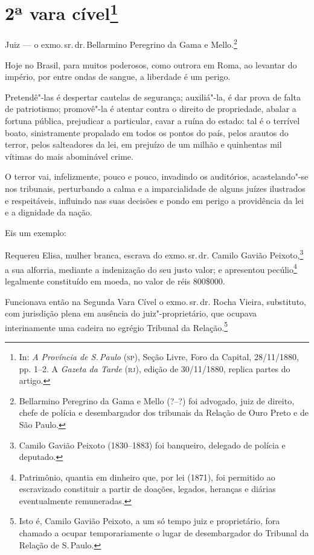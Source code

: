 \chapter{2ª vara cível\footnote[*]{In: \emph{A Província de S.\,Paulo}
  (\textsc{sp}), Seção Livre, Foro da Capital, 28/11/1880, pp. 1--2. A
  \emph{Gazeta da Tarde} (\textsc{rj}), edição de 30/11/1880, replica
  partes do artigo.}}


Juiz --- o exmo.\,sr.\,dr.\,Bellarmino Peregrino da Gama e
Mello.\footnote{Bellarmino Peregrino da Gama e Mello (?--?) foi
  advogado, juiz de direito, chefe de polícia e desembargador dos
  tribunais da Relação de Ouro Preto e de São Paulo.}\smallskip

Hoje no Brasil, para muitos poderosos, como outrora em Roma, ao levantar
do império, por entre ondas de sangue, a liberdade é um perigo.

Pretendê"-las é despertar cautelas de segurança; auxiliá"-la, é dar prova
de falta de patriotismo; promovê"-la é atentar contra o direito de
propriedade, abalar a fortuna pública, prejudicar a particular, cavar a
ruína do estado: tal é o terrível boato, sinistramente propalado em
todos os pontos do país, pelos arautos do terror, pelos salteadores da
lei, em prejuízo de um milhão e quinhentas mil vítimas do mais
abominável crime.

O terror vai, infelizmente, pouco e pouco, invadindo os auditórios,
acastelando"-se nos tribunais, perturbando a calma e a imparcialidade de
alguns juízes ilustrados e respeitáveis, influindo nas suas decisões e
pondo em perigo a providência da lei e a dignidade da nação.

Eis um exemplo:

Requereu Elisa, mulher branca, escrava do exmo.\,sr.\,dr. Camilo Gavião
Peixoto,\footnote{Camilo Gavião Peixoto (1830--1883) foi banqueiro,
  delegado de polícia e deputado.} a sua alforria, mediante a
indenização do seu justo valor; e apresentou pecúlio\footnote{
  Patrimônio, quantia em dinheiro que, por lei (1871), foi permitido ao
  escravizado constituir a partir de doações, legados, heranças e
  diárias eventualmente remuneradas.} legalmente constituído em moeda,
no valor de réis 800\$000.

Funcionava então na Segunda Vara Cível o exmo.\,sr.\,dr. Rocha Vieira,
substituto, com jurisdição plena em ausência do juiz"-proprietário, que
ocupava interinamente uma cadeira no egrégio Tribunal da
Relação.\footnote{Isto é, Camilo Gavião Peixoto, a um só tempo juiz e
  proprietário, fora chamado a ocupar temporariamente o lugar de
  desembargador do Tribunal da Relação de S.\,Paulo.}

